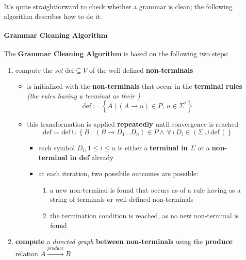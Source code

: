 \documentclass[english]{article}
\begin{document}
It's quite straightforward to check whether a grammar is clean;
the following algorithm describes how to do it.

\paragraph{Grammar Cleaning Algorithm}

The \textbf{Grammar Cleaning Algorithm} is based on the following two steps:

\begin{enumerate}[label=step \arabic*., ref=(step \arabic*), labelindent=1em, leftmargin=*, widest=step 2.]
  \item compute the \textit{set} \(\text{def} \subseteq V\) of the well defined \textbf{non-terminals}
        \begin{itemize}
          \item {} is initialized with the \textbf{non-terminals} that occur in the \textbf{terminal rules} \textit{(the rules having a terminal as their \RP)}
                \[ \text{def} \coloneqq \left\{ A \mid (A \rightarrow u) \in P, \ u \in \Sigma^\ast  \right\} \]
          \item this transformation is applied \textbf{repeatedly} until convergence is reached
                \[ \text{def} \coloneqq \text{def} \cup \left\{ B \mid (B \rightarrow D_1 \ldots D_n) \in P \land \, \forall \, i \, D_i \in \left(\Sigma \cup \text{def} \,\right)\right\} \]
                \begin{itemize}
                  \item each symbol \(D_i, 1 \leq i \leq n\) is either a \textbf{terminal in \(\Sigma\)} or a \textbf{non-terminal in def} already
                  \item at each iteration, two possibile outcomes are possible:
                        \begin{enumerate}
                          \item a new non-terminal is found that occurs as \LP of a rule having as \RP a string of terminals or well defined non-terminals
                          \item the termination condition is reached, as no new non-terminal is found
                        \end{enumerate}
                \end{itemize}
        \end{itemize}
  \item \textbf{compute} a \textit{directed graph} \textbf{between non-terminals} using the \textbf{produce} relation \(A \xrightarrow{produce} B\)

\end{enumerate}
\end{document}
